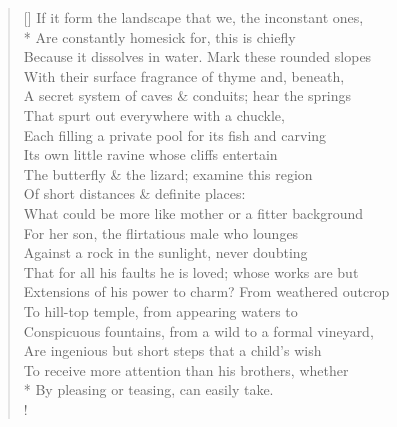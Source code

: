 \documentclass[MAIN]{subfiles}
\begin{document}
\settowidth{\versewidth}{If it form the landscape that we, the inconstant ones,}
\begin{verse}[\versewidth]
If it form the landscape that we, the inconstant ones,\\*
\vin Are constantly homesick for, this is chiefly\\
Because it dissolves in water. Mark these rounded slopes\\
\vin With their surface fragrance of thyme and, beneath,\\
A secret system of caves \& conduits; hear the springs\\
\vin That spurt out everywhere with a chuckle,\\
Each filling a private pool for its fish and carving\\
\vin Its own little ravine whose cliffs entertain\\
The butterfly \& the lizard; examine this region\\
\vin Of short distances \& definite places:\\
What could be more like mother or a fitter background\\
\vin For her son, the flirtatious male who lounges\\
Against a rock in the sunlight, never doubting\\
\vin That for all his faults he is loved; whose works are but\\
Extensions of his power to charm? From weathered outcrop\\
\vin To hill-top temple, from appearing waters to\\
Conspicuous fountains, from a wild to a formal vineyard,\\
\vin Are ingenious but short steps that a child's wish\\
To receive more attention than his brothers, whether\\*
\vin By pleasing or teasing, can easily take.\\!


\end{verse}
\end{document}
